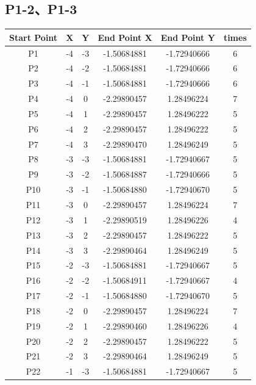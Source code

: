 \documentclass[a4paper,12pt]{article}
\begin{document}
\subsection{P1-2、P1-3}
\begin{longtable}{|c|c|c|c|c|c|}
    \hline
    Start Point & X & Y &  End Point X & End Point Y & times\\
    \hline
    P1 & -4 & -3 & -1.50684881 & -1.72940666 & 6 \\ 
    \hline
    P2 & -4 & -2 & -1.50684881 & -1.72940666 & 6 \\ 
    \hline
    P3 & -4 & -1 & -1.50684881 & -1.72940666 & 6 \\ 
    \hline
    P4 & -4 & 0 & -2.29890457 & 1.28496224 & 7 \\ 
    \hline
    P5 & -4 & 1 & -2.29890457 & 1.28496222 & 5 \\ 
    \hline
    P6 & -4 & 2 & -2.29890457 & 1.28496222 & 5 \\ 
    \hline
    P7 & -4 & 3 & -2.29890470 & 1.28496249 & 5 \\ 
    \hline
    P8 & -3 & -3 & -1.50684881 & -1.72940667 & 5 \\ 
    \hline
    P9 & -3 & -2 & -1.50684887 & -1.72940666 & 5 \\ 
    \hline
    P10 & -3 & -1 & -1.50684880 & -1.72940670 & 5 \\ 
    \hline
    P11 & -3 & 0 & -2.29890457 & 1.28496224 & 7 \\ 
    \hline
    P12 & -3 & 1 & -2.29890519 & 1.28496226 & 4 \\ 
    \hline
    P13 & -3 & 2 & -2.29890457 & 1.28496222 & 5 \\ 
    \hline
    P14 & -3 & 3 & -2.29890464 & 1.28496249 & 5 \\ 
    \hline
    P15 & -2 & -3 & -1.50684881 & -1.72940667 & 5 \\ 
    \hline
    P16 & -2 & -2 & -1.50684911 & -1.72940667 & 4 \\ 
    \hline
    P17 & -2 & -1 & -1.50684880 & -1.72940670 & 5 \\ 
    \hline
    P18 & -2 & 0 & -2.29890457 & 1.28496224 & 7 \\ 
    \hline
    P19 & -2 & 1 & -2.29890460 & 1.28496226 & 4 \\ 
    \hline
    P20 & -2 & 2 & -2.29890457 & 1.28496222 & 5 \\ 
    \hline
    P21 & -2 & 3 & -2.29890464 & 1.28496249 & 5 \\ 
    \hline
    P22 & -1 & -3 & -1.50684881 & -1.72940667 & 5 \\ 

\end{longtable}
\end{document}

